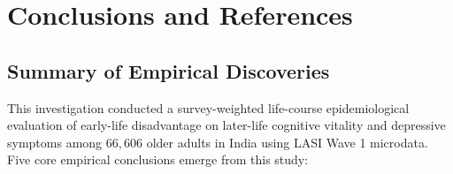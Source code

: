 
\section{Conclusions and References}

\subsection{Summary of Empirical Discoveries}
This investigation conducted a survey-weighted life-course epidemiological evaluation of early-life disadvantage on later-life cognitive vitality and depressive symptoms among $66{,}606$ older adults in India using LASI Wave 1 microdata. Five core empirical conclusions emerge from this study:

